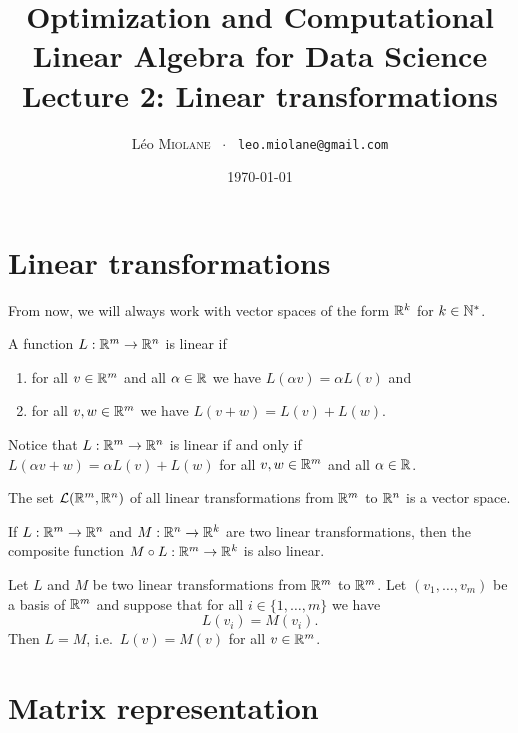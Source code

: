 \documentclass[11pt,nocut]{article}
\title{\vspace{-2.0cm}%
	Optimization and Computational Linear Algebra for Data Science\\
	Lecture 2: Linear transformations}
\author{Léo \textsc{Miolane} \ $\cdot$ \ \texttt{leo.miolane@gmail.com}}
\date{\today}
\begin{document}
\maketitle

\section{Linear transformations}

\begin{center}
From now, we will always work with vector spaces of the form $\mathbb{R}^k$ for $k \in \mathbb{N}^*$.
\end{center}
\vspace{1mm}

\begin{definition}
	A function $L: \mathbb{R}^m \to \mathbb{R}^n$ is linear if
	\begin{enumerate}[label=(\roman*)]
		\item for all $v \in \mathbb{R}^m$ and all $\alpha \in \mathbb{R}$ we have $L(\alpha v) = \alpha L(v)$ and
		\item for all $v,w \in \mathbb{R}^m$ we have $L(v + w) = L(v) + L(w)$.
	\end{enumerate}
\end{definition}

Notice that $L: \mathbb{R}^m \to \mathbb{R}^n$ is linear if and only if $L(\alpha v + w) = \alpha L(v) + L(w)$ for all $v,w \in \mathbb{R}^m$ and all $\alpha \in \mathbb{R}$.

\begin{proposition}
	The set $\mathcal{L}(\mathbb{R}^m, \mathbb{R}^n)$ of all linear transformations from $\mathbb{R}^m$ to $\mathbb{R}^n$ is a vector space.
\end{proposition}

\begin{proposition}
	If $L: \mathbb{R}^m \to \mathbb{R}^n$ and $M: \mathbb{R}^n \to \mathbb{R}^k$ are two linear transformations, then the composite function $M \circ L: \mathbb{R}^m \to \mathbb{R}^k$ is also linear.
\end{proposition}

\begin{theorem}\label{th:basis_cara}
	Let $L$ and $M$ be two linear transformations from $\mathbb{R}^m$ to $\mathbb{R}^m$.
	Let $(v_1, \dots, v_m)$ be a basis of $\mathbb{R}^m$ and suppose that for all $i \in \{1, \dots,m\}$ we have
	$$
	L(v_i) = M(v_i).
	$$
	Then $L = M$, i.e.\ $L(v) = M(v)$ for all $v \in \mathbb{R}^m$.
\end{theorem}

\section{Matrix representation}
\end{document}
